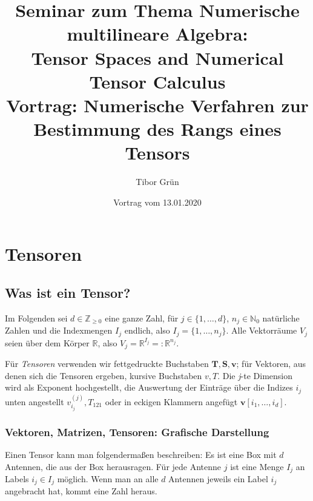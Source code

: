 \documentclass[11pt]{article} %
\title{\LARGE Seminar zum Thema Numerische multilineare Algebra:\\
\LARGE Tensor Spaces and Numerical Tensor Calculus\\
\vspace{5mm} %
\large Vortrag: Numerische Verfahren zur Bestimmung des Rangs eines Tensors}
\date{Vortrag vom 13.01.2020}
\author{Tibor Gr{\"u}n}
\theoremstyle{definition}
\numberwithin{equation}{section}
\begin{document}

	\maketitle

	\newpage

	\tableofcontents

	\newpage


\section{Tensoren}

\subsection{Was ist ein Tensor?}

Im Folgenden sei $d \in \mathbb{Z}_{\geq 0}$ eine ganze Zahl, für $j \in \{1,\dots , d \}$, $n_{j} \in \mathbb{N}_{0}$
 natürliche Zahlen
und die Indexmengen $I_{j}$ endlich, also $I_{j} = \{1,\dots , n_{j} \}$. Alle Vektorräume $V_{j}$ seien über dem Körper $\mathbb{R}$,
also $V_{j} = \mathbb{R}^{I_{j}} =: \mathbb{R}^{n_{j}}$.

Für \textit{Tensoren} verwenden wir fettgedruckte Buchstaben $\mathbf{T}, \mathbf{S}, \mathbf{v}$; für Vektoren, aus
 denen sich die
Tensoren ergeben, kursive Buchstaben $v, T$. Die \textit{j}-te Dimension wird als Exponent hochgestellt, die Auswertung der
Einträge über die Indizes $i_{j}$ unten angestellt $v^{(j)}_{i_{j}}, T_{121}$ oder in eckigen Klammern angefügt $\mathbf{v}[i_{1},\dots,i_{d}]$.

%
\subsubsection{Vektoren, Matrizen, Tensoren: Grafische Darstellung \cite{tensor_networs_simons}}
\begin{changemargin}{0pt}{0pt}

Einen Tensor kann man folgendermaßen beschreiben: Es ist eine Box mit $d$ Antennen, die aus der Box herausragen.
Für jede Antenne $j$ ist eine Menge $I_{j}$ an Labels $i_{j} \in I_{j}$ möglich.
Wenn man an alle $d$ Antennen jeweils ein Label $i_{j}$ angebracht hat, kommt eine Zahl heraus.
\end{changemargin}
\end{document}

